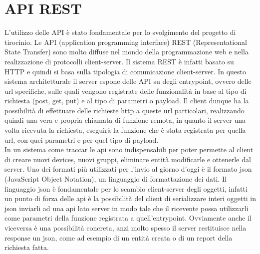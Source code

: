 \documentclass[a4paper,titlepage,12pt]{book}
\begin{document}
{{\section{
API REST}
L'utilizzo delle API è stato fondamentale per lo svolgimento del progetto di tirocinio. Le API (application programming interface) REST (Representational State Transfer) sono molto diffuse nel mondo della programmazione web e nella realizzazione di protocolli client-server. Il sistema REST è infatti basato su HTTP e quindi si basa sulla tipologia di comunicazione client-server. In questo sistema architetturale il server espone delle API su degli entrypoint, ovvero delle url specifiche, sulle quali vengono registrate delle funzionalità in base al tipo di richiesta (post, get, put) e al tipo di parametri o payload. Il client dunque ha la possibilità di effettuare delle richieste http a queste url particolari, realizzando quindi una vera e propria chiamata di funzione remota, in quanto il server una volta ricevuta la richiesta, eseguirà la funzione che è stata registrata per quella url, con quei parametri e per quel tipo di payload. \\
In un sistema come traccar le api sono indispensabili per poter permette al client di creare nuovi devices, nuovi gruppi, eliminare entità modificarle e ottenerle dal server. Uno dei formati più utilizzati per l'invio al giorno d'oggi è il formato json (JavaScript Object Notation), un linguaggio di formattazione dei dati. Il linguaggio json è fondamentale per lo scambio client-server degli oggetti, infatti un punto di forza delle api è la possibilità del client di serializzare interi oggetti in json inviarli ad una api lato server in modo tale che il ricevente possa utilizzarli come parametri della funzione registrata a quell'entrypoint. Ovviamente anche il viceversa è una possibilità concreta, anzi molto spesso il server restituisce nella response un json, come ad esempio di un entità creata o di un report della richiesta fatta.
}





}
\end{document}
